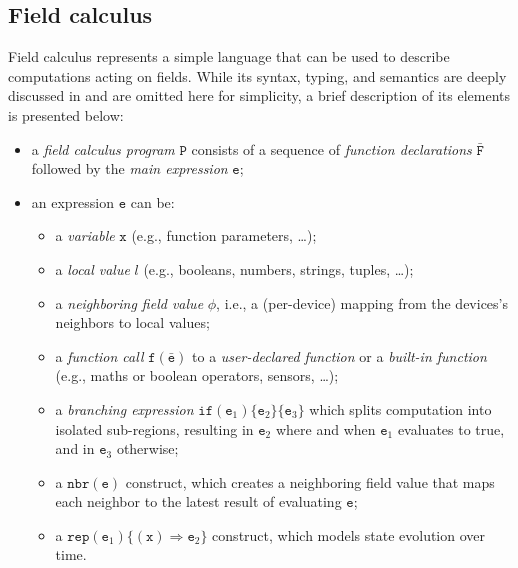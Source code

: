 \subsection{Field calculus}
\label{sec:field-calculus}

Field calculus represents a simple language that can be used to describe computations acting on fields.
%
While its syntax, typing, and semantics are deeply discussed in \cite{VIROLI2019100486} and are omitted here for simplicity, a brief description of its elements is presented below:
%
\begin{itemize}
    \item a \textit{field calculus program} $\texttt{P}$ consists of a sequence of \textit{function declarations} $\bar{\texttt{F}}$ followed by the \textit{main expression} $\texttt{e}$;
    \item an expression $\texttt{e}$ can be:
    \begin{itemize}
        \item a \textit{variable} $\texttt{x}$ (e.g., function parameters, \dots);
        \item a \textit{local value} $l$ (e.g., booleans, numbers, strings, tuples, \dots);
        \item a \textit{neighboring field value} $\phi$, i.e., a (per-device) mapping from the devices's neighbors to local values;
        \item a \textit{function call} $\texttt{f}(\bar{\texttt{e}})$ to a \textit{user-declared function} or a \textit{built-in function} (e.g., maths or boolean operators, sensors, \dots);
        \item a \textit{branching expression} $\texttt{if} (\texttt{e}_1)\{\texttt{e}_2\}\{\texttt{e}_3\}$ which splits computation into isolated sub-regions, resulting in $\texttt{e}_2$ where and when $\texttt{e}_1$ evaluates to true, and in $\texttt{e}_3$ otherwise;
        \item a $\texttt{nbr}(\texttt{e})$ construct, which creates a neighboring field value that maps each neighbor to the latest result of evaluating $\texttt{e}$;
        \item a $\texttt{rep}(\texttt{e}_1)\{(\texttt{x})\Rightarrow \texttt{e}_2\}$ construct, which models state evolution over time.
    \end{itemize}
\end{itemize}

